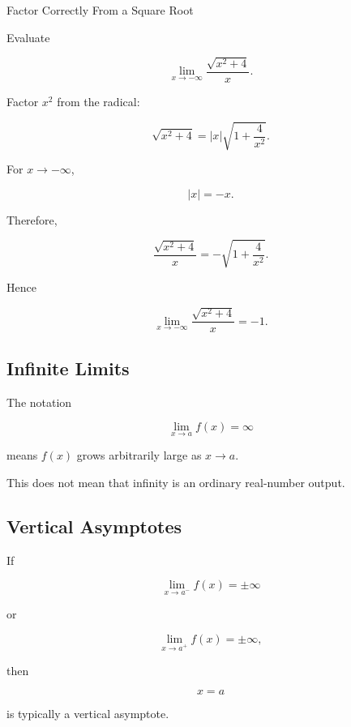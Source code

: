 \begin{workedexamplebox}{Factor Correctly From a Square Root}

Evaluate

\[
\lim_{x\to-\infty}
\frac{
\sqrt{x^2+4}
}{
x
}.
\]

Factor \(x^2\) from the radical:

\[
\sqrt{x^2+4}
=
|x|
\sqrt{
1+\frac4{x^2}
}.
\]

For \(x\to-\infty\),

\[
|x|=-x.
\]

Therefore,

\[
\frac{
\sqrt{x^2+4}
}{
x
}
=
-
\sqrt{
1+\frac4{x^2}
}.
\]

Hence

\begin{answerbox}
\[
\boxed{
\lim_{x\to-\infty}
\frac{
\sqrt{x^2+4}
}{
x
}
=
-1.
}
\]
\end{answerbox}

\end{workedexamplebox}

\subsection{Infinite Limits}
\label{subsec:infinite-limits-reference}

The notation

\[
\boxed{
\lim_{x\to a}f(x)
=
\infty
}
\]

means \(f(x)\) grows arbitrarily large as \(x\to a\).

This does not mean that infinity is an ordinary real-number output.

\subsection{Vertical Asymptotes}
\label{subsec:vertical-asymptote-limit}

If

\[
\lim_{x\to a^-}f(x)
=
\pm\infty
\]

or

\[
\lim_{x\to a^+}f(x)
=
\pm\infty,
\]

then

\[
\boxed{
x=a
}
\]

is typically a vertical asymptote.

